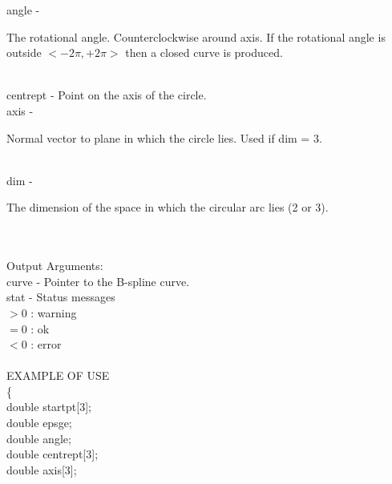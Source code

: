         \>\>    {\fov angle}    \> - \> \begin{minipg2}
                                The rotational angle. Counterclockwise around
                                axis. If the rotational angle
                                is outside $<-2\pi,+2\pi>$
                                then a closed curve is produced.
                                \end{minipg2}\\[0.3ex]
        \>\>    {\fov centrept}\> - \>  Point on the axis of the circle.\\
        \>\>    {\fov axis}     \> - \> \begin{minipg2}
                                Normal vector to plane in which the circle lies.
                                Used if dim = 3.
                                \end{minipg2}\\[0.8ex]
        \>\>    {\fov dim}      \> - \> \begin{minipg2}
                                The dimension of the space in which the
                                circular arc lies (2 or 3).
                                \end{minipg2}\\[0.3ex]
\\
\newpagetabs
        \>Output Arguments:\\
        \>\>    {\fov curve}    \> - \> Pointer to the B-spline curve.\\
        \>\>    {\fov stat}     \> - \> Status messages\\
                \>\>\>\>\>              $> 0$   : warning\\
                \>\>\>\>\>              $= 0$   : ok\\
                \>\>\>\>\>              $< 0$   : error\\
\\
EXAMPLE OF USE\\
                \>      \{ \\
                \>\>    double  \>      {\fov startpt}[3];\\
                \>\>    double  \>      {\fov epsge};\\
                \>\>    double  \>      {\fov angle};\\
                \>\>    double  \>      {\fov centrept}[3];\\
                \>\>    double  \>      {\fov axis}[3];\\
